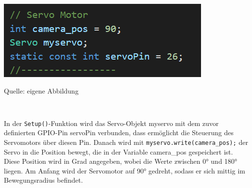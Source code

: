 \documentclass[ngerman,12pt,a4paper]{article}
\begin{document}
				\begin{center}
					\begin{minipage}{1\textwidth}
						\centering
						\includegraphics{Pictures/servopins}
						\label{fig:servopins}
						\vspace{-10pt}
						\begin{center}
							\par\small Quelle: eigene Abbildung 
						\end{center}
					\end{minipage} \\[0.70cm]
				\end{center}
				In der \texttt{Setup()}-Funktion wird das Servo-Objekt myservo mit dem zuvor definierten GPIO-Pin servoPin verbunden, dass ermöglicht die Steuerung des Servomotors über diesen Pin. Danach wird mit \texttt{myservo.write(camera\_pos);} der Servo in die Position bewegt, die in der Variable camera\_pos gespeichert ist. Diese Position wird in Grad angegeben, wobei die Werte zwischen 0° und 180° liegen. Am Anfang wird der Servomotor auf 90° gedreht, sodass er sich mittig im Bewegungsradius befindet.
				
\end{document}

